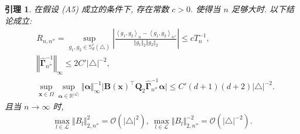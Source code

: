 \documentclass[a4paper,openay,14pt]{ctexbook}
\newtheorem{lem}{引理}
\numberwithin{equation}{section}
\numberwithin{lem}{section}
\begin{document}
\begin{lem} \label{Lemma:Rnn''Gamman''Bnormn''}
在假设 (A5) 成立的条件下, 存在常数 $c>0$. 使得当 $n$ 足够大时. 以下结论成立:
  \begin{align}
      & R_{n,n''} = \sup_{g_1,g_2\in\mathbb{S}_{d}^{r}(\triangle)}\left\vert\frac{\left<g_1,g_2\right>_{n}-\left<g_1,g_2\right>_{n''}}{\Vert g_1\Vert_2\Vert g_2\Vert_2}\right\vert\leq cT_n^{-1},\label{EQ:g''goodcondition}\\
      &\left\Vert \hat{\bm{\Gamma}}^{-1}_{n''}\right\Vert_{\infty} \leq 2C'\vert\triangle\vert^{-2},\label{EQ:Gammahat}\\
      &\sup_{\boldsymbol{x}\in \Omega}\sup_{ \boldsymbol{\alpha}\in\mathbb{R}^{\vert\mathcal{L}\vert}}\Vert\boldsymbol{\alpha}\Vert_{\infty}^{-1}\vert \mathbf{B}(\boldsymbol{x})^{\top}\mathbf{Q}_2\hat{\bm{\Gamma}}_{n''}^{-1}  \boldsymbol{\alpha} \vert \leq C'(d+1)(d+2)\vert\triangle\vert^{-2}.\label{EQ:BV}
  \end{align}
  且当 $n\to\infty$ 时,
   \begin{align}
       \max_{l\in\mathcal{L}}\Vert B_l\Vert_{2,n''}^2 = \mathcal{O}\left(\vert\triangle\vert^2\right),~\max_{l\in\mathcal{L}}\Vert B_l\Vert_{2,n''}^{-2} = \mathcal{O}\left(\vert\triangle\vert^{-2}\right). \label{EQ:B''empnorm}
   \end{align}
\end{lem}
\end{document}
